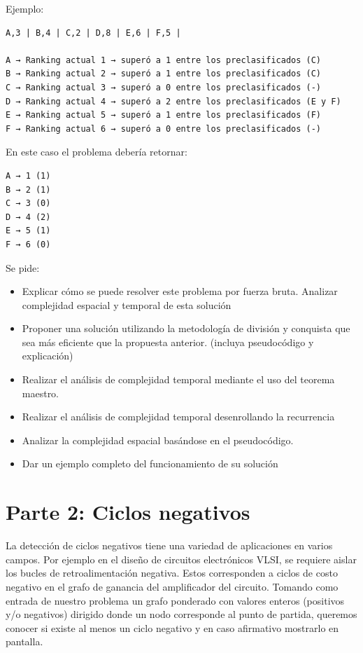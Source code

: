 \documentclass[titlepage,a4paper]{article}
\begin{document}
Ejemplo:

\begin{verbatim}
A,3 | B,4 | C,2 | D,8 | E,6 | F,5 |

A → Ranking actual 1 → superó a 1 entre los preclasificados (C)
B → Ranking actual 2 → superó a 1 entre los preclasificados (C)
C → Ranking actual 3 → superó a 0 entre los preclasificados (-)
D → Ranking actual 4 → superó a 2 entre los preclasificados (E y F)
E → Ranking actual 5 → superó a 1 entre los preclasificados (F)
F → Ranking actual 6 → superó a 0 entre los preclasificados (-)
\end{verbatim}

En este caso el problema debería retornar:

\begin{verbatim}
A → 1 (1)
B → 2 (1)
C → 3 (0)
D → 4 (2)
E → 5 (1)
F → 6 (0)
\end{verbatim}

Se pide:

\begin{itemize}
\item Explicar cómo se puede resolver este problema por fuerza bruta. Analizar complejidad espacial y temporal de esta solución

\item Proponer una solución utilizando la metodología de división y conquista que sea más eficiente que la propuesta anterior. (incluya pseudocódigo y explicación)

\item Realizar el análisis de complejidad temporal mediante el uso del teorema maestro.

\item Realizar el análisis de complejidad temporal desenrollando la recurrencia

\item Analizar la complejidad espacial basándose en el pseudocódigo.

\item Dar un ejemplo completo del funcionamiento de su solución
\end{itemize}

\section{Parte 2: Ciclos negativos}
\label{sec:org64dc170}

La detección de ciclos negativos tiene una variedad de aplicaciones en varios campos. Por ejemplo en el diseño de circuitos electrónicos VLSI, se requiere aislar los bucles de retroalimentación negativa. Estos corresponden a ciclos de costo negativo en el grafo de ganancia del amplificador del circuito. Tomando como entrada de nuestro problema un grafo ponderado con valores enteros (positivos y/o negativos) dirigido donde un nodo corresponde al punto de partida, queremos conocer si existe al menos un ciclo negativo y en caso afirmativo mostrarlo en pantalla.
\end{document}
